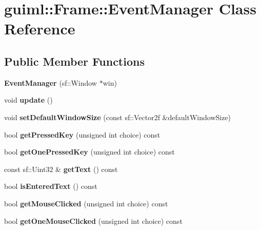 \section{guiml\-:\-:Frame\-:\-:Event\-Manager Class Reference}
\label{classguiml_1_1_frame_1_1_event_manager}
\subsection*{Public Member Functions}
\begin{DoxyCompactItemize}
\item 
{\bfseries Event\-Manager} (sf\-::\-Window $\ast$win)\label{classguiml_1_1_frame_1_1_event_manager_a37a67ce9ac50021e4cd05c3886353c47}

\item 
void {\bfseries update} ()\label{classguiml_1_1_frame_1_1_event_manager_a40bb56d56ba8d9773665cb8f397c13fe}

\item 
void {\bfseries set\-Default\-Window\-Size} (const sf\-::\-Vector2f \&default\-Window\-Size)\label{classguiml_1_1_frame_1_1_event_manager_aab818970dec163a34c1c7fd5d5826b42}

\item 
bool {\bfseries get\-Pressed\-Key} (unsigned int choice) const \label{classguiml_1_1_frame_1_1_event_manager_aaa05d623ca2272b7c8d8c791ef7b4d8c}

\item 
bool {\bfseries get\-One\-Pressed\-Key} (unsigned int choice) const \label{classguiml_1_1_frame_1_1_event_manager_a8e42abbb213f2a799201d361c3ffffc6}

\item 
const sf\-::\-Uint32 \& {\bfseries get\-Text} () const \label{classguiml_1_1_frame_1_1_event_manager_ac61f83911d972415ad6b0e2e161c5930}

\item 
bool {\bfseries is\-Entered\-Text} () const \label{classguiml_1_1_frame_1_1_event_manager_a02f3976afef66f3831faa95c6a153c28}

\item 
bool {\bfseries get\-Mouse\-Clicked} (unsigned int choice) const \label{classguiml_1_1_frame_1_1_event_manager_a22fb42ed17ff13719227416160b3168d}

\item 
bool {\bfseries get\-One\-Mouse\-Clicked} (unsigned int choice) const \label{classguiml_1_1_frame_1_1_event_manager_ac5c21757a79d519214a5a7e27b424124}


\end{DoxyCompactItemize}
